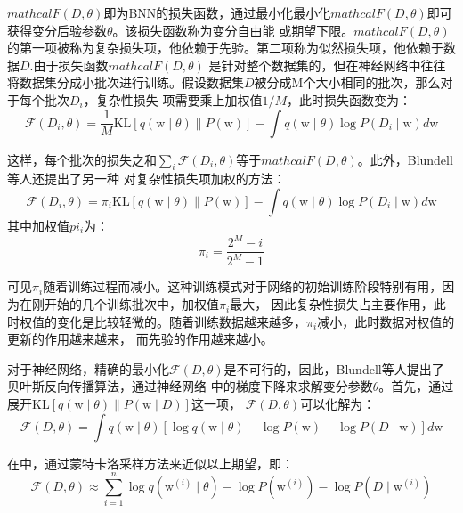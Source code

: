 $mathcal{F}(D, \theta)$即为BNN的损失函数，通过最小化最小化$mathcal{F}(D, \theta)$即可获得变分后验参数$θ$。该损失函数称为变分自由能\cite{neal1998view,friston2007variational}
或期望下限\cite{jaakkola2000bayesian}。$mathcal{F}(D, \theta)$的第一项被称为复杂损失项，他依赖于先验。第二项称为似然损失项，他依赖于数据$D$.由于损失函数$mathcal{F}(D, \theta)$
是针对整个数据集的，但在神经网络中往往将数据集分成小批次进行训练。假设数据集$D$被分成M个大小相同的批次，那么对于每个批次$D_i$，复杂性损失
项需要乘上加权值$1/M$，此时损失函数变为\cite{blundell2015weight}：
\begin{equation}
	\label{}
	\mathcal{F}\left(D_i, \theta\right)=\frac{1}{M} \mathrm{KL}[q(\mathrm{w} \mid \theta) \| P(\mathrm{w})]-\int q(\mathrm{w} \mid \theta) \log P\left(D_i \mid \mathrm{w}\right) d \mathrm{w}
\end{equation}

这样，每个批次的损失之和$\sum_{i}\mathcal{F}\left(D_i, \theta\right)$等于$mathcal{F}(D, \theta)$。此外，Blundell等人\cite{blundell2015weight}还提出了另一种
对复杂性损失项加权的方法：
\begin{equation}
	\label{}
	\mathcal{F}\left(D_i, \theta\right)=\pi_i \mathrm{KL}[q(\mathrm{w} \mid \theta) \| P(\mathrm{w})]-\int q(\mathrm{w} \mid \theta) \log P\left(D_i \mid \mathrm{w}\right) d \mathrm{w}
\end{equation}
其中加权值$pi_i$为：
\begin{equation}
	\label{}
	\pi_i = \frac{2^M-i}{2^M - 1}
\end{equation}

可见$\pi_i$随着训练过程而减小。这种训练模式对于网络的初始训练阶段特别有用，因为在刚开始的几个训练批次中，加权值$\pi_i$最大，
因此复杂性损失占主要作用，此时权值的变化是比较轻微的。随着训练数据越来越多，$\pi_i$减小，此时数据对权值的更新的作用越来越来，
而先验的作用越来越小。

对于神经网络，精确的最小化$\mathcal{F}(D, \theta)$是不可行的，因此，Blundell等人\cite{blundell2015weight}提出了贝叶斯反向传播算法，通过神经网络
中的梯度下降来求解变分参数$\theta$。首先，通过展开$\mathrm{KL}[q(\mathrm{w} \mid \theta) \| P(\mathrm{w} \mid D)]$这一项，
$\mathcal{F}(D, \theta)$可以化解为：
\begin{equation}
	\label{kl_sandu}
	\mathcal{F}(D, \theta)=\int q(\mathrm{w} \mid \theta)[\log q(\mathrm{w} \mid \theta)-\log P(\mathrm{w})-\log P(D \mid \mathrm{w})] d \mathrm{w}
\end{equation}

在\cite{}中，通过蒙特卡洛采样方法来近似以上期望，即：
\begin{equation}
	\label{mtkl_sample_methoes}
	\mathcal{F}(D, \theta) \approx \sum_{i=1}^n \log q\left(\mathrm{w}^{(i)} \mid \theta\right)-\log P\left(\mathrm{w}^{(i)}\right)-\log P\left(D \mid \mathrm{w}^{(i)}\right)
\end{equation}


